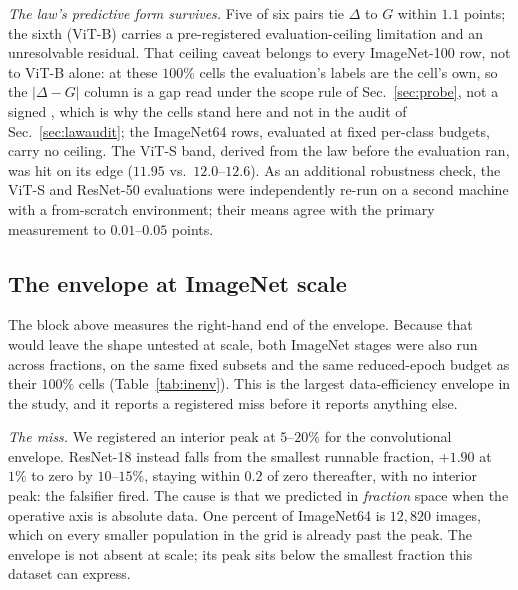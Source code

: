 \emph{The law's predictive form survives.} Five of six pairs tie $\Delta$ to
$G$ within $1.1$ points; the sixth (ViT-B) carries a pre-registered
evaluation-ceiling limitation and an unresolvable residual. That ceiling
caveat belongs to every ImageNet-100 row, not to ViT-B alone: at these
$100\%$ cells the evaluation's labels are the cell's own, so the
$|\Delta - G|$ column is a gap read under the scope rule of
Sec.~\ref{sec:probe}, not a signed \readout{}, which is why the cells stand
here and not in the audit of Sec.~\ref{sec:lawaudit}; the ImageNet64
rows, evaluated at fixed per-class budgets, carry no ceiling. The ViT-S band,
derived from the law before the evaluation ran, was hit on its edge ($11.95$
vs.\ $12.0$--$12.6$). As an additional robustness check, the ViT-S and
ResNet-50 evaluations were independently re-run on a second machine with a
from-scratch environment; their means agree with the primary measurement to
$0.01$--$0.05$ points.

\subsection{The envelope at ImageNet scale}\label{sec:scaleenvelope}

The block above measures the right-hand end of the envelope. Because that would
leave the shape untested at scale, both ImageNet stages were also run across
fractions, on the same fixed subsets and the same reduced-epoch budget as their
$100\%$ cells (Table~\ref{tab:inenv}). This is the largest data-efficiency
envelope in the study, and it reports a registered miss before it reports
anything else.

\emph{The miss.} We registered an interior peak at $5$--$20\%$ for the
convolutional envelope. ResNet-18 instead falls from the smallest
runnable fraction, $+1.90$ at $1\%$ to zero by $10$--$15\%$, staying within
$0.2$ of zero thereafter, with no interior peak:
the falsifier fired. The cause is that we predicted in \emph{fraction} space
when the operative axis is absolute data. One percent of ImageNet64 is
$12{,}820$ images, which on every smaller population in the grid is already
past the peak. The envelope is not absent at scale; its peak sits below the
smallest fraction this dataset can express.

